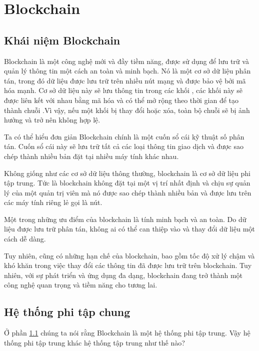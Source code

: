\section{Blockchain}
\subsection{Khái niệm Blockchain}
\label{subsec:khainiemblockchain}
Blockchain là một công nghệ mới và đầy tiềm năng, được sử dụng để lưu 
trữ và quản lý thông tin một cách an toàn và minh bạch. Nó là một cơ 
sở dữ liệu phân tán, trong đó dữ liệu được lưu trữ trên nhiều nút 
mạng và được bảo vệ bởi mã hóa mạnh. Cơ sở dữ liệu này sẽ lưu thông tin trong các khối , các khối 
này sẽ được liên kết với nhau bằng mã hóa và có thể mở rộng theo 
thời gian để tạo thành chuỗi .Vì vậy, 
nếu một khối bị thay đổi hoặc xóa, toàn bộ chuỗi sẽ bị ảnh 
hưởng và trở nên không hợp lệ.

Ta có thể hiểu đơn giản Blockchain chính là một cuốn sổ cái kỹ thuật 
số phân tán. Cuốn sổ cái này sẽ lưu trữ tất cả các loại thông tin 
giao dịch và được sao chép thành nhiều bản đặt tại nhiều máy tính khác nhau. 

Không giống như các cơ sở dữ liệu thông thường, blockchain là cơ sở dữ liệu phi tập trung. 
Tức là blockchain không đặt tại một vị trí nhất định và chịu sự quản lý của một quản trị viên mà nó được sao chép thành nhiều bản và được lưu trên các máy tính riêng lẻ gọi là nút. 


Một trong những ưu điểm của blockchain là tính minh bạch và an toàn. 
Do dữ liệu được lưu trữ phân tán, không ai có thể can thiệp vào và 
thay đổi dữ liệu một cách dễ dàng.

Tuy nhiên, cũng có những hạn chế của blockchain, bao gồm tốc độ xử 
lý chậm và khó khăn trong việc thay đổi các thông tin đã được lưu 
trữ trên blockchain. Tuy nhiên, với sự phát triển và ứng dụng đa 
dạng, blockchain đang trở thành một công nghệ quan trọng và tiềm 
năng cho tương lai.
\subsection{Hệ thống phi tập chung}

Ở phần \ref{subsec:khainiemblockchain} chúng ta nói rằng Blockchain là một hệ thống 
phi tập trung. Vậy hệ thống phi tập trung khác hệ thống tập trung
như thế nào?

